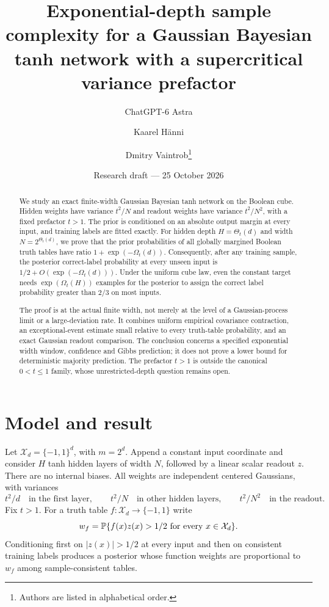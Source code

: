 \documentclass[11pt]{article}
\title{Exponential-depth sample complexity for a Gaussian Bayesian\\tanh network with a supercritical variance prefactor}
\author{ChatGPT-6 Astra \and Kaarel H\"anni \and Dmitry Vaintrob\thanks{Authors are listed in alphabetical order.}}
\date{Research draft --- 25 October 2026}
\begin{document}
\maketitle
\begin{abstract}
We study an exact finite-width Gaussian Bayesian tanh network on the Boolean cube. Hidden weights have variance $t^2/N$ and readout weights have variance $t^2/N^2$, with a fixed prefactor $t>1$. The prior is conditioned on an absolute output margin at every input, and training labels are fitted exactly. For hidden depth $H=\Theta_t(d)$ and width $N=2^{\Theta_t(d)}$, we prove that the prior probabilities of all globally margined Boolean truth tables have ratio $1+\exp(-\Omega_t(d))$. Consequently, after any training sample, the posterior correct-label probability at every unseen input is $1/2+O(\exp(-\Omega_t(d)))$. Under the uniform cube law, even the constant target needs $\exp(\Omega_t(H))$ examples for the posterior to assign the correct label probability greater than $2/3$ on most inputs.

The proof is at the actual finite width, not merely at the level of a Gaussian-process limit or a large-deviation rate. It combines uniform empirical covariance contraction, an exceptional-event estimate small relative to every truth-table probability, and an exact Gaussian readout comparison. The conclusion concerns a specified exponential width window, confidence and Gibbs prediction; it does not prove a lower bound for deterministic majority prediction. The prefactor $t>1$ is outside the canonical $0<t\le1$ family, whose unrestricted-depth question remains open.
\end{abstract}

\section{Model and result}
Let $\mathcal X_d=\{-1,1\}^d$, with $m=2^d$. Append a constant input coordinate and consider $H$ tanh hidden layers of width $N$, followed by a linear scalar readout $z$. There are no internal biases. All weights are independent centered Gaussians, with variances
\begin{equation}\label{eq:prior}
 t^2/d\quad\text{in the first layer},\qquad t^2/N\quad\text{in other hidden layers},\qquad t^2/N^2\quad\text{in the readout}.
\end{equation}
Fix $t>1$. For a truth table $f:\mathcal X_d\to\{-1,1\}$ write
\begin{equation}\label{eq:wf}
 w_f=\mathbb P\{f(x)z(x)>1/2\text{ for every }x\in\mathcal X_d\}.
\end{equation}
Conditioning first on $|z(x)|>1/2$ at every input and then on consistent training labels produces a posterior whose function weights are proportional to $w_f$ among sample-consistent tables.
\end{document}
